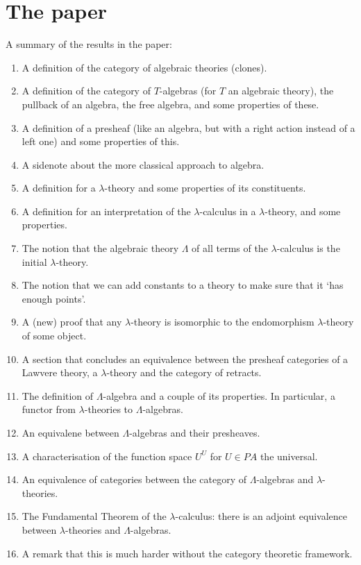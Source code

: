 \documentclass{amsbook}
\begin{document}
  \section{The paper}
  A summary of the results in the paper:
  \begin{enumerate}
    \item A definition of the category of algebraic theories (clones).
    \item A definition of the category of $ T $-algebras (for $ T $ an algebraic theory), the pullback of an algebra, the free algebra, and some properties of these.
    \item A definition of a presheaf (like an algebra, but with a right action instead of a left one) and some properties of this.
    \item A sidenote about the more classical approach to algebra.
    \item A definition for a $ \lambda $-theory and some properties of its constituents.
    \item A definition for an interpretation of the $ \lambda $-calculus in a $ \lambda $-theory, and some properties.
    \item The notion that the algebraic theory $ \Lambda $ of all terms of the $ \lambda $-calculus is the initial $ \lambda $-theory.
    \item The notion that we can add constants to a theory to make sure that it `has enough points'.
    \item A (new) proof that any $ \lambda $-theory is isomorphic to the endomorphism $ \lambda $-theory of some object.
    \item A section that concludes an equivalence between the presheaf categories of a Lawvere theory, a $ \lambda $-theory and the category of retracts.
    \item The definition of $ \Lambda $-algebra and a couple of its properties. In particular, a functor from $ \lambda $-theories to $ \Lambda $-algebras.
    \item An equivalene between $ \Lambda $-algebras and their presheaves.
    \item A characterisation of the function space $ U^U $ for $ U \in PA $ the universal.
    \item An equivalence of categories between the category of $ \Lambda $-algebras and $ \lambda $-theories.
    \item The Fundamental Theorem of the $ \lambda $-calculus: there is an adjoint equivalence between $ \lambda $-theories and $ \Lambda $-algebras.
    \item A remark that this is much harder without the category theoretic framework.
  \end{enumerate}
  
\end{document}
